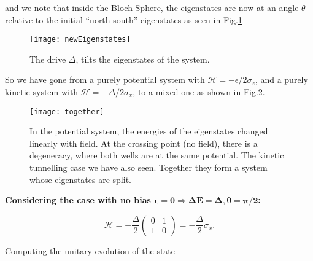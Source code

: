    \noindent and we note that  inside the Bloch Sphere, the eigenstates
   are now at an angle $\theta$ relative to the initial ``north-south''
   eigenstates as seen in Fig.\ref{newEigenstates}

   \begin{figure}[h]
     \begin{center}
       \texttt{[image: newEigenstates]}
       \caption{\small The drive $\Delta$, tilts the eigenstates of the
         system. \red{$\tan(\theta) = \frac{\Delta}{\epsilon}$}}
       \label{newEigenstates}
     \end{center}
   \end{figure}

   \begin{framed}\noindent
     \noindent  So we  have gone  from a  purely potential  system with
     $\mathcal{H} =  -\epsilon/2\sigma_z$, and a purely  kinetic system
     with $\mathcal{H} = -\Delta/2\sigma_x$, to a mixed one as shown in
     Fig.\ref{l1-combined}.
   \end{framed}

   \begin{figure}[h]
     \begin{center}
       \texttt{[image: together]}
       \caption{\small  In the  potential system,  the energies  of the
         eigenstates changed linearly with field. At the crossing point
         (no field), there is a degeneracy, where both wells are at the
         same  potential.  The  kinetic  tunnelling case  we have  also
         seen.  Together  they  form  a system  whose  eigenstates  are
         split.}
       \label{l1-combined}
     \end{center}
   \end{figure}


   \textbf{Considering      the       case      with       no      bias
     $\mathbf{\epsilon = 0 \Rightarrow \Delta E = \Delta, \theta = \pi/2}$:}

    \[
      \mathcal{H} = -\frac{\Delta}{2}
      \begin{pmatrix}
        0 & 1\\ 1 & 0
      \end{pmatrix} = -\frac{\Delta}{2} \sigma_x.
    \]

    \noindent Computing the unitary evolution of the state


